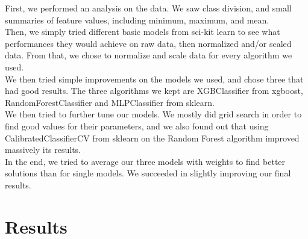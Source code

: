 \documentclass[12pt]{article}
\begin{document}
First, we performed an analysis on the data. We saw class division, and small
summaries of feature values, including minimum, maximum, and mean.\\
Then, we simply tried different basic models from sci-kit learn to see what performances they would
achieve on raw data, then normalized and/or scaled data. From that, we chose to
normalize and scale data for every algorithm we used.\\
We then tried simple improvements on the models we used, and chose three that had good
results. The three algorithms we kept are XGBClassifier from xgboost,
RandomForestClassifier and MLPClassifier from sklearn.\\
We then tried to further tune our models. We mostly did grid search in order to
find good values for their parameters, and we also found out that using
CalibratedClassifierCV from sklearn on the Random Forest algorithm improved
massively its results. \\
In the end, we tried to average our three models with weights to find better
solutions than for single models. We succeeded in slightly improving our final results.


\section{Results}
\end{document}
